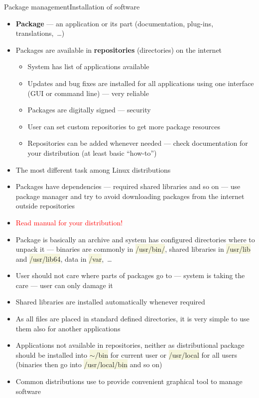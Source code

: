 \documentclass[compress, xelatex, 11pt, xcolor=svgnames, aspectratio=169,
	hyperref={
		bookmarks=true,
		unicode=true,
		colorlinks=true,
		pdftitle={Linux, command line and MetaCentrum},
		plainpages=false,
		pdfauthor={Vojtech Zeisek},
		pdfsubject={Course about use of Linux command line, writing shell scripts and using MetaCentrum of CESNET},
		pdfcreator={XeLaTeX},
		pdfkeywords={Linux, GNU, BASH, shell, command line, MetaCentrum},
		linkcolor=DarkRed, %
		anchorcolor=DarkBlue, %
		citecolor=Indigo, %
		filecolor=NavyBlue, %
		menucolor=DarkMagenta, %
		urlcolor=DarkBlue, %
		},
	url={hyphens, lowtilde} %
	]{beamer}
\renewcommand{\texttt}[1]{\colorbox{Beige}{{\ttfamily #1}}}
\renewcommand{\alert}[1]{\textcolor{red}{#1}}
\begin{document}
\begin{frame}[allowframebreaks]{Package management}{Installation of software}
	\begin{itemize}
		\item \textbf{Package} --- an application or its part (documentation, plug-ins, translations,~\ldots)
		\item Packages are available in \textbf{repositories} (directories) on the internet
		\begin{itemize}
			\item System has list of applications available
			\item Updates and bug fixes are installed for all applications using one interface (GUI or command line) --- very reliable
			\item Packages are digitally signed --- security
			\item User can set custom repositories to get more package resources
			\item Repositories can be added whenever needed --- check documentation for your distribution (at least basic \enquote{how-to})
		\end{itemize}
		\item The most different task among Linux distributions
		\item Packages have dependencies --- required shared libraries and so on --- use package manager and try to avoid downloading packages from the internet outside repositories
		\item \alert{Read manual for your distribution!}
		\item Package is basically an archive and system has configured directories where to unpack it --- binaries are commonly in \texttt{/usr/bin/}, shared libraries in \texttt{/usr/lib} and \texttt{/usr/lib64}, data in \texttt{/var},~\ldots
		\item User should not care where parts of packages go to --- system is taking the care --- user can only damage it
		\item Shared libraries are installed automatically whenever required
		\item As all files are placed in standard defined directories, it is very simple to use them also for another applications
		\item Applications not available in repositories, neither as distributional package should be installed into \texttt{$\sim$/bin} for current user or \texttt{/usr/local} for all users (binaries then go into \texttt{/usr/local/bin} and so on)
		\item Common distributions use to provide convenient graphical tool to manage software

\end{itemize}
\end{frame}
\end{document}
